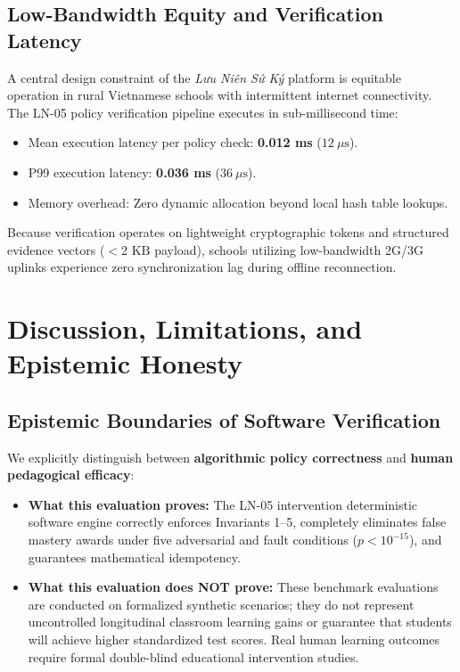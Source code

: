 \documentclass[11pt,a4paper]{article}
\begin{document}
\subsection{Low-Bandwidth Equity and Verification Latency}
A central design constraint of the \textit{Lưu Niên Sứ Ký} platform is equitable operation in rural Vietnamese schools with intermittent internet connectivity. The LN-05 policy verification pipeline executes in sub-millisecond time:
\begin{itemize}[leftmargin=*]
    \item Mean execution latency per policy check: \textbf{0.012 ms} ($12 \ \mu\text{s}$).
    \item P99 execution latency: \textbf{0.036 ms} ($36 \ \mu\text{s}$).
    \item Memory overhead: Zero dynamic allocation beyond local hash table lookups.
\end{itemize}
Because verification operates on lightweight cryptographic tokens and structured evidence vectors ($< 2 \text{ KB}$ payload), schools utilizing low-bandwidth 2G/3G uplinks experience zero synchronization lag during offline reconnection.

\section{Discussion, Limitations, and Epistemic Honesty}

\subsection{Epistemic Boundaries of Software Verification}
We explicitly distinguish between \textbf{algorithmic policy correctness} and \textbf{human pedagogical efficacy}:
\begin{itemize}[leftmargin=*]
    \item \textbf{What this evaluation proves:} The LN-05 intervention deterministic software engine correctly enforces Invariants 1--5, completely eliminates false mastery awards under five adversarial and fault conditions ($p < 10^{-15}$), and guarantees mathematical idempotency.
    \item \textbf{What this evaluation does NOT prove:} These benchmark evaluations are conducted on formalized synthetic scenarios; they do not represent uncontrolled longitudinal classroom learning gains or guarantee that students will achieve higher standardized test scores. Real human learning outcomes require formal double-blind educational intervention studies.
\end{itemize}
\end{document}
